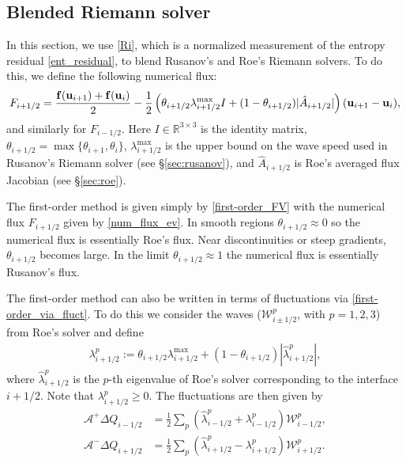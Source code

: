 \documentclass[preprint, 11pt]{article}
\newcommand{\W}{{\mathcal W}}
\newcommand{\A}{{\mathcal A}}
\newcommand{\apdq}{\A^+ \!\!{\Delta} Q}
\newcommand{\amdq}{\A^- \!\!{\Delta} Q}
\newcommand{\imh}{{i-1/2}}
\newcommand{\iph}{{i+1/2}}
\newcommand{\bff}{{\bf f}}
\newcommand{\bfu}{{\bf u}}
\begin{document}
\subsection{Blended Riemann solver}\label{sec:blended_rs}
In this section, we use \eqref{Ri}, which is a normalized measurement of the entropy residual \eqref{ent_residual},
to blend Rusanov's and Roe's Riemann solvers. To do this, we define the following numerical flux:
\begin{align}\label{num_flux_ev}
  F_{i+1/2} = \frac{\bff(\bfu_{i+1})+\bff(\bfu_i)}{2}
  - \frac{1}{2} \left( \theta_{i+1/2}\lambda_{i+1/2}^{\max} I + (1-\theta_{i+1/2})|\hat A_{i+1/2}| \right)(\bfu_{i+1}-\bfu_{i}),
\end{align}
and similarly for $F_{i-1/2}$. Here $I\in\mathbb{R}^{3\times 3}$ is the identity matrix,
$\theta_{i+1/2}=\max\{\theta_{i+1},\theta_i\}$, $\lambda_{i+1/2}^{\max}$ is the
upper bound on the wave speed used in Rusanov's Riemann solver (see \S \ref{sec:rusanov}),
and $\hat A_{i+1/2}$ is Roe's averaged flux Jacobian (see \S \ref{sec:roe}).

The first-order method is given simply by \eqref{first-order_FV}
with the numerical flux $F_{i+1/2}$ given by \eqref{num_flux_ev}.
In smooth regions $\theta_{i+1/2}\approx 0$ so the numerical flux is essentially Roe's flux.
Near discontinuities or steep gradients, $\theta_{i+1/2}$ becomes large. In the limit $\theta_{i+1/2}\approx 1$
the numerical flux is essentially Rusanov's flux.

The first-order method can also be written in terms of fluctuations via \eqref{first-order_via_fluct}.
To do this we consider the waves ($\W^p_{i\pm 1/2}$, with $p=1,2,3$)
from Roe's solver and define
\begin{align}\label{lambda_p}
  \lambda_{i+1/2}^p := \theta_{i+1/2}\lambda_{i+1/2}^{\max} + (1-\theta_{i+1/2})|\hat \lambda_{i+1/2}^p|,
\end{align}
where $\hat\lambda_{i+1/2}^p$ is the $p$-th eigenvalue of Roe's solver corresponding to the
interface $i+1/2$. Note that $\lambda_{i+1/2}^p\geq 0$.
The fluctuations are then given by
\begin{subequations}\label{ev_fluctuations}
\begin{align}
  \apdq_\imh & = \frac{1}{2}\sum_p \left(\hat\lambda_{i-1/2}^p + \lambda_{i-1/2}^p\right)\W_{i-1/2}^p, \\
  \amdq_\iph & = \frac{1}{2}\sum_p \left(\hat\lambda_{i+1/2}^p - \lambda_{i+1/2}^p\right)\W_{i+1/2}^p.
\end{align}
\end{subequations}
\end{document}
